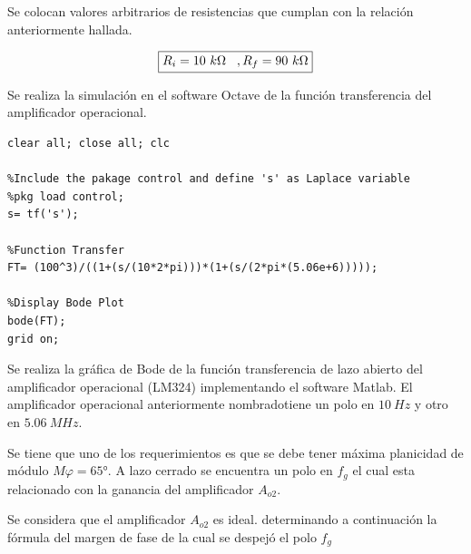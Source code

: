 \bigskip
\hspace{1mm} Se colocan valores arbitrarios de resistencias que cumplan con la relación anteriormente hallada.

\begin{equation}
    \boxed{
        R_i=10~k\Omega \hspace{3mm} , R_f=90~k\Omega
    }
\end{equation}

\bigskip

\hspace{1mm} Se realiza la simulación en el software Octave de la función transferencia del amplificador operacional.

\begin{lstlisting}
clear all; close all; clc

%Include the pakage control and define 's' as Laplace variable
%pkg load control;
s= tf('s');

%Function Transfer
FT= (100^3)/((1+(s/(10*2*pi)))*(1+(s/(2*pi*(5.06e+6)))));

%Display Bode Plot
bode(FT);
grid on; 
\end{lstlisting}
\bigskip

\hspace{1mm}  Se realiza la gráfica de Bode de la función transferencia de lazo abierto del amplificador operacional (LM324) implementando el software Matlab. El amplificador operacional anteriormente nombradotiene un polo en \(10~Hz\) y otro en \(5.06~MHz\).


\bigskip
\hspace{1mm} Se tiene que uno de los requerimientos es que se debe tener máxima planicidad de módulo \(M\varphi =65°\).  A lazo cerrado se encuentra un polo en \(f_g\) el cual esta relacionado con la ganancia del amplificador \(A_{o2}\).
\bigskip

\hspace{1mm} Se considera que el amplificador \(A_{o2}\) es ideal. determinando a continuación la fórmula del margen de fase de la cual se despejó el polo \( 
f_g \)
 
